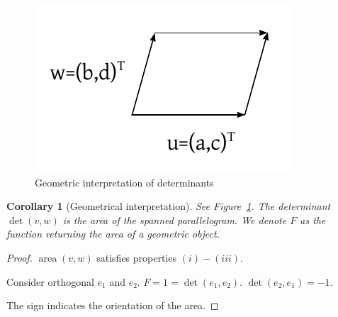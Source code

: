 \documentclass[a4paper]{article}
\newcounter{lecref}[section]
\numberwithin{lecref}{section}
\newtheorem{corollary}[lecref]{Corollary}
\begin{document}
\begin{figure}[t]
  \begin{center}
    \includegraphics{img/01_geometric_interpretation_determinant.pdf}
    \caption{Geometric interpretation of determinants}
    \label{img:geo_det}
  \end{center}
\end{figure}

\begin{corollary}[Geometrical interpretation]
  See Figure~\ref{img:geo_det}.
  The determinant $\det(v,w)$ is the area of the spanned parallelogram.
  We denote $F$ as the function returning the area of a geometric object.
\end{corollary}

\begin{proof}
  $\operatorname{area}(v,w)$ satisfies properties $(i)-(iii)$.

  Consider orthogonal $e_1$ and $e_2$.
  $F = 1 = \det(e_1, e_2)$. $\det(e_2, e_1) = -1$.

  The sign indicates the orientation of the area.
\end{proof}
\end{document}
